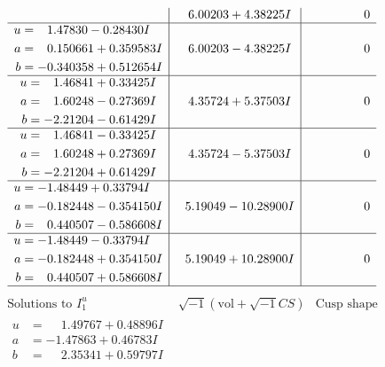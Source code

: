 \documentclass[1p]{elsarticle_modified}
\theoremstyle{definition}
\newcommand{\I}{\sqrt{-1}}
\begin{document}
$$\begin{array}{c|c|c}
 & \phantom{-}6.00203 + 4.38225 I & \phantom{-0.000000 } 0 \\ \hline\begin{aligned}
u &= \phantom{-}1.47830 - 0.28430 I \\
a &= \phantom{-}0.150661 + 0.359583 I \\
b &= -0.340358 + 0.512654 I\end{aligned}
 & \phantom{-}6.00203 - 4.38225 I & \phantom{-0.000000 } 0 \\ \hline\begin{aligned}
u &= \phantom{-}1.46841 + 0.33425 I \\
a &= \phantom{-}1.60248 - 0.27369 I \\
b &= -2.21204 - 0.61429 I\end{aligned}
 & \phantom{-}4.35724 + 5.37503 I & \phantom{-0.000000 } 0 \\ \hline\begin{aligned}
u &= \phantom{-}1.46841 - 0.33425 I \\
a &= \phantom{-}1.60248 + 0.27369 I \\
b &= -2.21204 + 0.61429 I\end{aligned}
 & \phantom{-}4.35724 - 5.37503 I & \phantom{-0.000000 } 0 \\ \hline\begin{aligned}
u &= -1.48449 + 0.33794 I \\
a &= -0.182448 - 0.354150 I \\
b &= \phantom{-}0.440507 - 0.586608 I\end{aligned}
 & \phantom{-}5.19049 - 10.28900 I & \phantom{-0.000000 } 0 \\ \hline\begin{aligned}
u &= -1.48449 - 0.33794 I \\
a &= -0.182448 + 0.354150 I \\
b &= \phantom{-}0.440507 + 0.586608 I\end{aligned}
 & \phantom{-}5.19049 + 10.28900 I & \phantom{-0.000000 } 0\\
 \hline 
 \end{array}$$\newpage$$\begin{array}{c|c|c}  
\text{Solutions to }I^u_{1}& \I (\text{vol} + \sqrt{-1}CS) & \text{Cusp shape}\\
 \hline 
\begin{aligned}
u &= \phantom{-}1.49767 + 0.48896 I \\
a &= -1.47863 + 0.46783 I \\
b &= \phantom{-}2.35341 + 0.59797 I\end{aligned}

\end{array}$$
\end{document}
